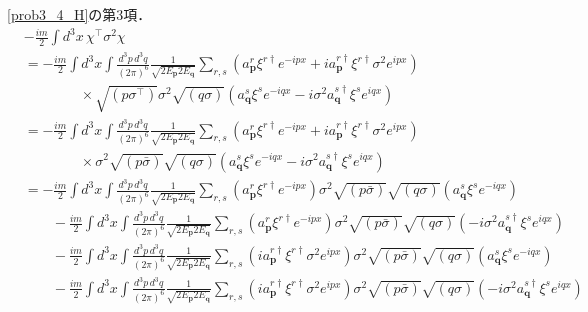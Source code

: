 \eqref{prob3_4_H}の第3項．
\begin{align*}
  & - \frac{im}{2}\int d^3x \, \chi^\top \sigma^2 \chi \\
  & = - \frac{im}{2}\int d^3x \int \frac{d^3p\,d^3q}{(2\pi)^6} \frac{1}{\sqrt{2E_{\boldsymbol{p}}2E_{\boldsymbol{q}}}}
  \sum_{r, s} \left( a_{\boldsymbol{p}}^{r} \xi^{r\dagger} e^{-ipx} + i a_{\boldsymbol{p}}^{r\dagger} \xi^{r\dagger} \sigma^2 e^{ipx} \right) \\
  & \qquad \qquad \times \sqrt{(p\sigma^\top)} \sigma^2 \sqrt{(q \sigma)} \left( a_{\boldsymbol{q}}^s \xi^s e^{-iqx} - i \sigma^2 a_{\boldsymbol{q}}^{s\dagger} \xi^s e^{iqx} \right) \\
  & = - \frac{im}{2}\int d^3x \int \frac{d^3p\,d^3q}{(2\pi)^6} \frac{1}{\sqrt{2E_{\boldsymbol{p}}2E_{\boldsymbol{q}}}}
  \sum_{r, s} \left( a_{\boldsymbol{p}}^{r} \xi^{r\dagger} e^{-ipx} + i a_{\boldsymbol{p}}^{r\dagger} \xi^{r\dagger} \sigma^2 e^{ipx} \right) \\
  & \qquad \qquad \times \sigma^2 \sqrt{(p\bar\sigma)} \sqrt{(q \sigma)} \left( a_{\boldsymbol{q}}^s \xi^s e^{-iqx} - i \sigma^2 a_{\boldsymbol{q}}^{s\dagger} \xi^s e^{iqx} \right) \\
  & = - \frac{im}{2}\int d^3x \int \frac{d^3p\,d^3q}{(2\pi)^6} \frac{1}{\sqrt{2E_{\boldsymbol{p}}2E_{\boldsymbol{q}}}}
  \sum_{r, s} \left( a_{\boldsymbol{p}}^{r} \xi^{r\dagger} e^{-ipx} \right) \sigma^2 \sqrt{(p\bar\sigma)} \sqrt{(q \sigma)} \left( a_{\boldsymbol{q}}^s \xi^s e^{-iqx}\right) \\
  & \qquad - \frac{im}{2}\int d^3x \int \frac{d^3p\,d^3q}{(2\pi)^6} \frac{1}{\sqrt{2E_{\boldsymbol{p}}2E_{\boldsymbol{q}}}}
  \sum_{r, s} \left( a_{\boldsymbol{p}}^{r} \xi^{r\dagger} e^{-ipx} \right) \sigma^2 \sqrt{(p\bar\sigma)} \sqrt{(q \sigma)} \left( - i \sigma^2 a_{\boldsymbol{q}}^{s\dagger} \xi^s e^{iqx} \right) \\
  & \qquad - \frac{im}{2}\int d^3x \int \frac{d^3p\,d^3q}{(2\pi)^6} \frac{1}{\sqrt{2E_{\boldsymbol{p}}2E_{\boldsymbol{q}}}}
  \sum_{r, s} \left( i a_{\boldsymbol{p}}^{r\dagger} \xi^{r\dagger} \sigma^2 e^{ipx} \right) \sigma^2 \sqrt{(p\bar\sigma)} \sqrt{(q \sigma)} \left( a_{\boldsymbol{q}}^s \xi^s e^{-iqx} \right) \\
  & \qquad - \frac{im}{2}\int d^3x \int \frac{d^3p\,d^3q}{(2\pi)^6} \frac{1}{\sqrt{2E_{\boldsymbol{p}}2E_{\boldsymbol{q}}}}
  \sum_{r, s} \left( i a_{\boldsymbol{p}}^{r\dagger} \xi^{r\dagger} \sigma^2 e^{ipx} \right) \sigma^2 \sqrt{(p\bar\sigma)} \sqrt{(q \sigma)} \left( - i \sigma^2 a_{\boldsymbol{q}}^{s\dagger} \xi^s e^{iqx} \right) \\

\end{align*}

